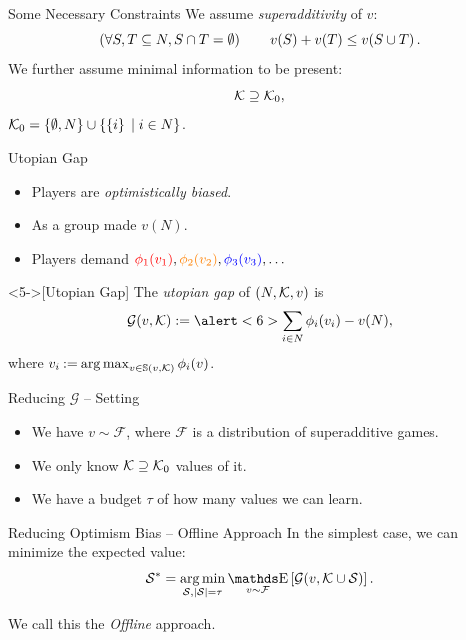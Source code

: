 \documentclass[aspectratio=169]{beamer}
\def\blue#1{{\color{blue} #1}}
\def\orange#1{{\color{orange} #1}}
\def\red#1{{\color{red} #1}}
\def\s{\mathcal{S}}
\begin{document}
\begin{frame}{Some Necessary Constraints}
	We assume \emph{superadditivity} of $ v $: \[
		\left( \forall S,T \subseteq N, S \cap T = \emptyset \right)\qquad \fce{v}{S} + \fce{v}{T} \leq \fce{v}{S \cup T}.
	\]
	We further assume minimal information to be present: \[
		\k \supseteq \k_0,
	\]
	$ \k_0 = \left\{ \emptyset, N \right\} \cup \left\{ \left\{ i \right\} \suchthat i \in N \right\} $.
\end{frame}



\begin{frame}{Utopian Gap}
    \begin{itemize}[ ]
        \item<2-> Players are \emph{optimistically biased}.
        \item<3-> As a group made $ v(N) $.
				\item<4-> Players demand $ \red{\shapley[1]{v_1}}, \orange{\shapley[2]{v_2}}, \blue{\shapley[3]{v_3}}, \ldots $
    \end{itemize}
		\vspace{2em}

		\begin{definition}<5->[Utopian Gap]
        The \emph{utopian gap} of $ \left( N, \k, v \right) $ is \[
					\mathcal{G}(v, \k) := \alert<6>{\sum_{i \in N} \shapley[i]{v_i}} - v(N),
        \]
				where $v_i \deq \argmax_{v \in \mathbb{S}(v,\k)} \shapley[i]v$.
			\end{definition}
\end{frame}

\begin{frame}{Reducing $ \mathcal{G} $ -- Setting}
	\begin{itemize}[ ]
		\item<2-> We have \alert<2>{$ v \sim \mathcal{F} $}, where $ \mathcal{F} $ is a distribution of superadditive games.
		\item<3-> We only \alert<3>{know $ \k \supseteq \k_0 $} values of it.
		\item<4-> We have a \alert<4>{budget $ \tau $} of how many values we can learn.
	\end{itemize}
\end{frame}

\begin{frame}{Reducing Optimism Bias -- Offline Approach}
	In the simplest case, we can \alert{minimize the expected value}: \[
		\s^* = \argmin_{\s, \absolute{\s} = \tau} \E_{v \sim \mathcal{F}} \left[ \mathcal{G}(v,\k \cup \s) \right].
	\]

	\vspace{2em}
	We call this the \emph{Offline} approach.
\end{frame}
\end{document}
